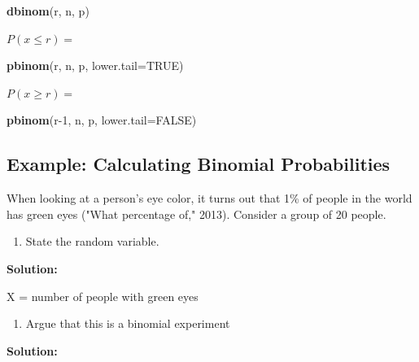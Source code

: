 \documentclass[
]{book}
\newenvironment{Shaded}{\begin{snugshade}}{\end{snugshade}}
\newcommand{\DataTypeTok}[1]{\textcolor[rgb]{0.13,0.29,0.53}{#1}}
\newcommand{\DecValTok}[1]{\textcolor[rgb]{0.00,0.00,0.81}{#1}}
\newcommand{\KeywordTok}[1]{\textcolor[rgb]{0.13,0.29,0.53}{\textbf{#1}}}
\newcommand{\NormalTok}[1]{#1}
\newcommand{\OtherTok}[1]{\textcolor[rgb]{0.56,0.35,0.01}{#1}}
\providecommand{\tightlist}{%
  \setlength{\itemsep}{0pt}\setlength{\parskip}{0pt}}
\begin{document}
\begin{Shaded}
\begin{Highlighting}[]
\KeywordTok{dbinom}\NormalTok{(r, n, p)}
\end{Highlighting}
\end{Shaded}

\(P(x \le r)=\)

\begin{Shaded}
\begin{Highlighting}[]
\KeywordTok{pbinom}\NormalTok{(r, n, p, }\DataTypeTok{lower.tail=}\OtherTok{TRUE}\NormalTok{)}
\end{Highlighting}
\end{Shaded}

\(P(x \ge r)=\)

\begin{Shaded}
\begin{Highlighting}[]
\KeywordTok{pbinom}\NormalTok{(r}\DecValTok{-1}\NormalTok{, n, p, }\DataTypeTok{lower.tail=}\OtherTok{FALSE}\NormalTok{)}
\end{Highlighting}
\end{Shaded}

\hypertarget{example-calculating-binomial-probabilities}{%
\subsection{Example: Calculating Binomial Probabilities}\label{example-calculating-binomial-probabilities}}

When looking at a person's eye color, it turns out that 1\% of people in the world has green eyes ("What percentage of," 2013). Consider a group of 20 people.

\begin{enumerate}
\def\labelenumi{\alph{enumi}.}
\tightlist
\item
  State the random variable.
\end{enumerate}

\textbf{Solution:}

X = number of people with green eyes

\begin{enumerate}
\def\labelenumi{\alph{enumi}.}
\setcounter{enumi}{1}
\tightlist
\item
  Argue that this is a binomial experiment
\end{enumerate}

\textbf{Solution:}
\end{document}

